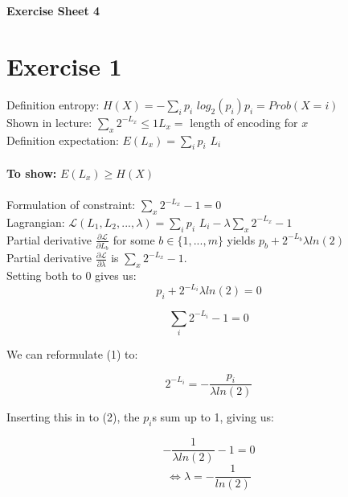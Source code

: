 \documentclass[11pt,a4paper]{article}
\newcommand{\sheetNr}{4}
\begin{document}
\begin{center}
\LARGE{\textbf{Exercise Sheet \sheetNr}}
\end{center}

\section*{Exercise 1}
Definition entropy: $H(X) = -\displaystyle\sum_i p_i$ $log_2(p_i)$\hphantom{aaaaaa}$p_i=Prob(X=i)$\\
Shown in lecture: $\displaystyle\sum_x 2^{-L_x}\le 1$\hphantom{aaaaaaaaaaaaaaaaaa}$L_x=$ length of encoding for $x$\\
Definition expectation: $E(L_x) = \displaystyle\sum_i p_i$ $L_i$\\
\\
\textbf{To show:} $E(L_x)\ge H(X)$\\
\\
Formulation of constraint: $\displaystyle\sum_x 2^{-L_x}-1 = 0$\\
Lagrangian: $\mathcal{L}(L_1,L_2,...,\lambda) = \displaystyle\sum_i p_i$ $L_i - \lambda \displaystyle\sum_x 2^{-L_x}-1$\\

Partial derivative $\frac{\partial \mathcal{L}}{\partial L_b}$ for some $b\in\{1,...,m\}$ yields $p_b+2^{-L_b} \lambda ln(2)$\\
Partial derivative $\frac{\partial \mathcal{L}}{\partial \lambda}$ is $\displaystyle\sum_x 2^{-L_x}-1$.\\
Setting both to $0$ gives us:\\

\begin{equation}
p_i+2^{-L_i} \lambda ln(2) = 0
\end{equation}

\begin{equation}
\displaystyle\sum_i 2^{-L_i}-1=0
\end{equation}

We can reformulate (1) to:

\begin{equation}
2^{-L_i}=-\frac{p_i}{\lambda ln(2)}
\end{equation}

Inserting this in to (2), the $p_i$s sum up to 1, giving us:

\begin{equation}
-\frac{1}{\lambda ln(2)}-1 = 0
\end{equation}
\begin{equation}
\Leftrightarrow \lambda = -\frac{1}{ln(2)}
\end{equation}
\end{document}
